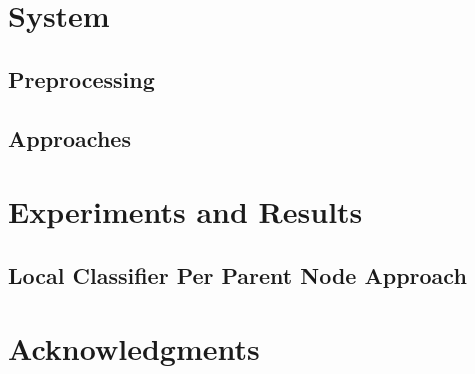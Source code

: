 \documentclass[11pt]{article}
\begin{document}
\section{System}

\subsection{Preprocessing}


\subsection{Approaches}


\section{Experiments and Results}

\subsection{Local Classifier Per Parent Node Approach}




\section*{Acknowledgments}




\end{document}
